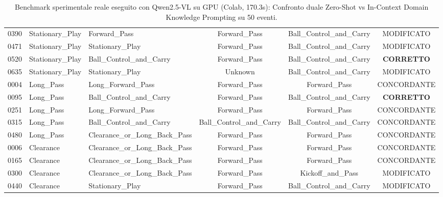 \begin{table}[t]
\begin{tabular}{cllccc}
0390 & Stationary\_Play & Forward\_Pass & Forward\_Pass & Ball\_Control\_and\_Carry & MODIFICATO \\
0471 & Stationary\_Play & Stationary\_Play & Forward\_Pass & Ball\_Control\_and\_Carry & MODIFICATO \\
0520 & Stationary\_Play & Ball\_Control\_and\_Carry & Forward\_Pass & Ball\_Control\_and\_Carry & \textbf{CORRETTO} \\
0635 & Stationary\_Play & Stationary\_Play & Unknown & Ball\_Control\_and\_Carry & MODIFICATO \\
0004 & Long\_Pass & Long\_Forward\_Pass & Forward\_Pass & Forward\_Pass & CONCORDANTE \\
0095 & Long\_Pass & Ball\_Control\_and\_Carry & Forward\_Pass & Ball\_Control\_and\_Carry & \textbf{CORRETTO} \\
0251 & Long\_Pass & Long\_Forward\_Pass & Forward\_Pass & Forward\_Pass & CONCORDANTE \\
0315 & Long\_Pass & Ball\_Control\_and\_Carry & Ball\_Control\_and\_Carry & Ball\_Control\_and\_Carry & CONCORDANTE \\
0480 & Long\_Pass & Clearance\_or\_Long\_Back\_Pass & Forward\_Pass & Forward\_Pass & CONCORDANTE \\
0006 & Clearance & Clearance\_or\_Long\_Back\_Pass & Forward\_Pass & Forward\_Pass & CONCORDANTE \\
0165 & Clearance & Clearance\_or\_Long\_Back\_Pass & Forward\_Pass & Forward\_Pass & CONCORDANTE \\
0300 & Clearance & Clearance\_or\_Long\_Back\_Pass & Forward\_Pass & Kickoff\_and\_Pass & MODIFICATO \\
0440 & Clearance & Stationary\_Play & Forward\_Pass & Ball\_Control\_and\_Carry & MODIFICATO \\
\hline
\end{tabular}
\caption{Benchmark sperimentale reale eseguito con Qwen2.5-VL su GPU (Colab, 170.3s): Confronto duale Zero-Shot vs In-Context Domain Knowledge Prompting su 50 eventi.}
\label{tab:qwen_dual_live_50_clips}
\end{table}